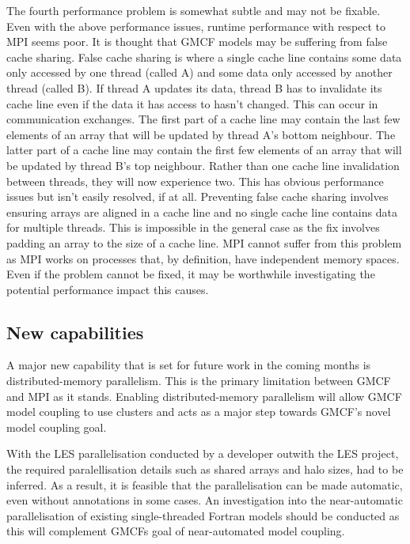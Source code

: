 The fourth performance problem is somewhat subtle and may not be fixable. Even
with the above performance issues, runtime performance with respect to MPI seems
poor. It is thought that GMCF models may be suffering from false cache sharing.
False cache sharing is where a single cache line contains some data only
accessed by one thread (called A) and some data only accessed by another thread
(called B). If thread A updates its data, thread B has to invalidate its cache
line even if the data it has access to hasn't changed. This can occur in
communication exchanges. The first part of a cache line may contain the last few
elements of an array that will be updated by thread A's bottom neighbour. The
latter part of a cache line may contain the first few elements of an array that
will be updated by thread B's top neighbour. Rather than one cache line
invalidation between threads, they will now experience two. This has obvious
performance issues but isn't easily resolved, if at all. Preventing false cache
sharing involves ensuring arrays are aligned in a cache line and no single cache
line contains data for multiple threads. This is impossible in the general case
as the fix involves padding an array to the size of a cache line. MPI cannot
suffer from this problem as MPI works on processes that, by definition, have
independent memory spaces. Even if the problem cannot be fixed, it may be
worthwhile investigating the potential performance impact this causes.

\subsection{New capabilities}

A major new capability that is set for future work in the coming months is
distributed-memory parallelism. This is the primary limitation between GMCF and
MPI as it stands. Enabling distributed-memory parallelism will allow GMCF model
coupling to use clusters and acts as a major step towards GMCF's novel model
coupling goal.

With the LES parallelisation conducted by a developer outwith the LES project,
the required paralellisation details such as shared arrays and halo sizes, had
to be inferred. As a result, it is feasible that the parallelisation can be made
automatic, even without annotations in some cases. An investigation into the
near-automatic parallelisation of existing single-threaded Fortran models should
be conducted as this will complement GMCFs goal of near-automated model
coupling.

